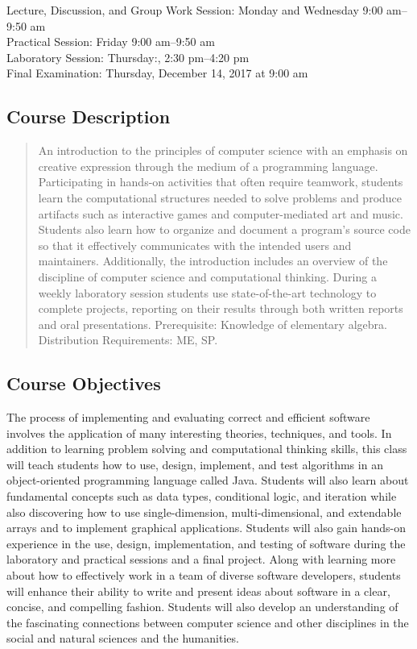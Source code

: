 \documentclass[11pt]{article}
\begin{document}
Lecture, Discussion, and Group Work Session: Monday and Wednesday 9:00 am--9:50 am \\
Practical Session: Friday 9:00 am--9:50 am \\
Laboratory Session: Thursday:, 2:30 pm--4:20 pm \\
Final Examination: Thursday, December 14, 2017 at 9:00 am

\subsection*{Course Description}

\begin{quote}

An introduction to the principles of computer science with an emphasis on creative expression through the medium of a
programming language. Participating in hands-on activities that often require teamwork, students learn the computational
structures needed to solve problems and produce artifacts such as interactive games and computer-mediated art and music.
Students also learn how to organize and document a program's source code so that it effectively communicates with the
intended users and maintainers. Additionally, the introduction includes an overview of the discipline of computer
science and computational thinking. During a weekly laboratory session students use state-of-the-art technology to
complete projects, reporting on their results through both written reports and oral presentations. Prerequisite:
Knowledge of elementary algebra. Distribution Requirements: ME, SP.\@ \\

\end{quote}

\subsection*{Course Objectives}

The process of implementing and evaluating correct and efficient software involves the application of many interesting
theories, techniques, and tools. In addition to learning problem solving and computational thinking skills, this class
will teach students how to use, design, implement, and test algorithms in an object-oriented programming language called
Java. Students will also learn about fundamental concepts such as data types, conditional logic, and iteration while
also discovering how to use single-dimension, multi-dimensional, and extendable arrays and to implement graphical
applications. Students will also gain hands-on experience in the use, design, implementation, and testing of software
during the laboratory and practical sessions and a final project. Along with learning more about how to effectively work
in a team of diverse software developers, students will enhance their ability to write and present ideas about software
in a clear, concise, and compelling fashion. Students will also develop an understanding of the fascinating connections
between computer science and other disciplines in the social and natural sciences and the humanities.
\end{document}
